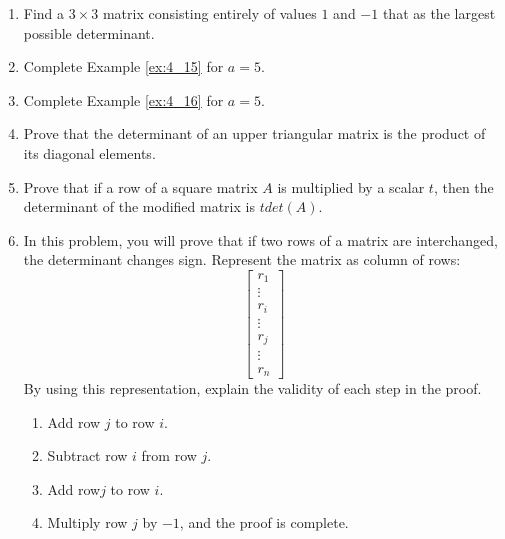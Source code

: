 \documentclass[../main.tex]{subfiles}
\begin{document}
\begin{enumerate}[label=\textbf{\thechapter.\arabic{*}}]
  \item \label{pr:4_9} Find a \(3 \times 3\) matrix consisting entirely of values \(1\) and \(-1\) that as the largest possible determinant.
  \item \label{pr:4_10} Complete Example \ref{ex:4_15} for \(a = 5\).
  \item \label{pr:4_11} Complete Example \ref{ex:4_16} for \(a = 5\).
  \item \label{pr:4_12} Prove that the determinant of an upper triangular matrix is the product of its diagonal elements.
  \item \label{pr:4_13} Prove that if a row of a square matrix \(A\) is multiplied by a scalar \(t\), then the determinant of the modified matrix is \(t det(A)\).
  \item \label{pr:4_14} In this problem, you will prove that if two rows of a matrix are interchanged, the determinant changes sign. Represent the matrix as column of rows:
  \begin{equation*}
    \begin{bmatrix}
      r_1 \\ \vdots \\ r_i \\ \vdots \\ r_j \\ \vdots \\ r_n
    \end{bmatrix}
  \end{equation*}
  By using this representation, explain the validity of each step in the proof.
  \begin{enumerate}[leftmargin=*, label=\textbf{\alph{*}.}]
    \item Add row \(j\) to row \(i\).
    \item Subtract row \(i\) from row \(j\).
    \item Add row\(j\) to row \(i\).
    \item Multiply row \(j\) by \(-1\), and the proof is complete.
  \end{enumerate}
  

\end{enumerate}
\end{document}
